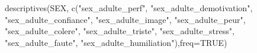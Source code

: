 \documentclass[
]{article}
\newenvironment{Shaded}{\begin{snugshade}}{\end{snugshade}}
\newcommand{\AttributeTok}[1]{\textcolor[rgb]{0.77,0.63,0.00}{#1}}
\newcommand{\ConstantTok}[1]{\textcolor[rgb]{0.00,0.00,0.00}{#1}}
\newcommand{\FunctionTok}[1]{\textcolor[rgb]{0.00,0.00,0.00}{#1}}
\newcommand{\NormalTok}[1]{#1}
\newcommand{\StringTok}[1]{\textcolor[rgb]{0.31,0.60,0.02}{#1}}
\begin{document}
\begin{Shaded}
\begin{Highlighting}[]
\FunctionTok{descriptives}\NormalTok{(SEX, }\FunctionTok{c}\NormalTok{(}\StringTok{"sex\_adulte\_perf"}\NormalTok{, }\StringTok{"sex\_adulte\_demotivation"}\NormalTok{, }\StringTok{"sex\_adulte\_confiance"}\NormalTok{, }\StringTok{"sex\_adulte\_image"}\NormalTok{, }\StringTok{"sex\_adulte\_peur"}\NormalTok{, }\StringTok{"sex\_adulte\_colere"}\NormalTok{, }\StringTok{"sex\_adulte\_triste"}\NormalTok{, }\StringTok{"sex\_adulte\_stress"}\NormalTok{, }\StringTok{"sex\_adulte\_faute"}\NormalTok{, }\StringTok{"sex\_adulte\_humiliation"}\NormalTok{),}\AttributeTok{freq=}\ConstantTok{TRUE}\NormalTok{)}
\end{Highlighting}
\end{Shaded}
\end{document}
